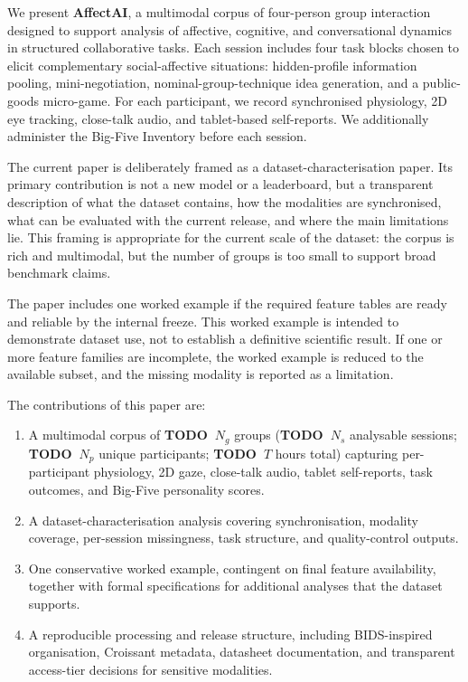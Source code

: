 \documentclass{article}
\begin{document}
We present \textbf{AffectAI}, a multimodal corpus of four-person group
interaction designed to support analysis of affective, cognitive, and
conversational dynamics in structured collaborative tasks.
Each session includes four task blocks chosen to elicit complementary
social-affective situations: hidden-profile information pooling,
mini-negotiation, nominal-group-technique idea generation, and a public-goods
micro-game.
For each participant, we record synchronised physiology, 2D eye tracking,
close-talk audio, and tablet-based self-reports.
We additionally administer the Big-Five Inventory before each session.

The current paper is deliberately framed as a dataset-characterisation paper.
Its primary contribution is not a new model or a leaderboard, but a transparent
description of what the dataset contains, how the modalities are synchronised,
what can be evaluated with the current release, and where the main limitations
lie.
This framing is appropriate for the current scale of the dataset: the corpus is
rich and multimodal, but the number of groups is too small to support broad
benchmark claims.

The paper includes one worked example if the required feature tables are ready
and reliable by the internal freeze.
This worked example is intended to demonstrate dataset use, not to establish a
definitive scientific result.
If one or more feature families are incomplete, the worked example is reduced
to the available subset, and the missing modality is reported as a limitation.

The contributions of this paper are:
\begin{enumerate}
  \item A multimodal corpus of \textbf{TODO~$N_g$} groups
    (\textbf{TODO~$N_s$} analysable sessions;
    \textbf{TODO~$N_p$} unique participants;
    \textbf{TODO~$T$} hours total) capturing per-participant physiology,
    2D gaze, close-talk audio, tablet self-reports, task outcomes, and
    Big-Five personality scores.
  \item A dataset-characterisation analysis covering synchronisation,
    modality coverage, per-session missingness, task structure, and
    quality-control outputs.
  \item One conservative worked example, contingent on final feature
    availability, together with formal specifications for additional analyses
    that the dataset supports.
  \item A reproducible processing and release structure, including
    BIDS-inspired organisation, Croissant metadata, datasheet documentation,
    and transparent access-tier decisions for sensitive modalities.
\end{enumerate}
\end{document}
